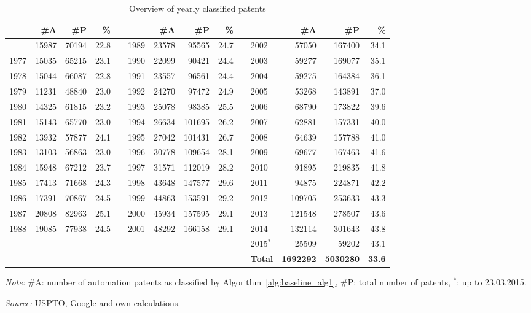 \begin{table}[!htb]
\begin{small}
\begin{threeparttable}
\caption{{\normalsize Overview of yearly classified patents}}
\label{table:table_yearsstats}
\begin{tabular}{lrrrrlrrrrlrrr}
\toprule \addlinespace[0.5em]
 & \textbf{\#A} & \textbf{\#P} & \textbf{\%} & \phantom{aaa} & & \textbf{\#A} & \textbf{\#P} & \textbf{\%} & \phantom{aaa} & & \textbf{\#A} & \textbf{\#P} & \textbf{\%}\tabularnewline[0.1cm]
\midrule \addlinespace[0.5em]
1976 & 15987 & 70194 & 22.8 & & 1989 & 23578 & 95565 & 24.7 & & 2002 & 57050 & 167400 & 34.1 \tabularnewline[0.1cm]
1977 & 15035 & 65215 & 23.1 & & 1990 & 22099 & 90421 & 24.4 & & 2003 & 59277 & 169077 & 35.1 \tabularnewline[0.1cm]
1978 & 15044 & 66087 & 22.8 & & 1991 & 23557 & 96561 & 24.4 & & 2004 & 59275 & 164384 & 36.1 \tabularnewline[0.1cm]
1979 & 11231 & 48840 & 23.0 & & 1992 & 24270 & 97472 & 24.9 & & 2005 & 53268 & 143891 & 37.0 \tabularnewline[0.1cm]
1980 & 14325 & 61815 & 23.2 & & 1993 & 25078 & 98385 & 25.5 & & 2006 & 68790 & 173822 & 39.6 \tabularnewline[0.1cm]
1981 & 15143 & 65770 & 23.0 & & 1994 & 26634 & 101695 & 26.2 & & 2007 & 62881 & 157331 & 40.0 \tabularnewline[0.1cm]
1982 & 13932 & 57877 & 24.1 & & 1995 & 27042 & 101431 & 26.7 & & 2008 & 64639 & 157788 & 41.0 \tabularnewline[0.1cm]
1983 & 13103 & 56863 & 23.0 & & 1996 & 30778 & 109654 & 28.1 & & 2009 & 69677 & 167463 & 41.6 \tabularnewline[0.1cm]
1984 & 15948 & 67212 & 23.7 & & 1997 & 31571 & 112019 & 28.2 & & 2010 & 91895 & 219835 & 41.8 \tabularnewline[0.1cm]
1985 & 17413 & 71668 & 24.3 & & 1998 & 43648 & 147577 & 29.6 & & 2011 & 94875 & 224871 & 42.2 \tabularnewline[0.1cm]
1986 & 17391 & 70867 & 24.5 & & 1999 & 44863 & 153591 & 29.2 & & 2012 & 109705 & 253633 & 43.3 \tabularnewline[0.1cm]
1987 & 20808 & 82963 & 25.1 & & 2000 & 45934 & 157595 & 29.1 & & 2013 & 121548 & 278507 & 43.6 \tabularnewline[0.1cm]
1988 & 19085 & 77938 & 24.5 & & 2001 & 48292 & 166158 & 29.1 & & 2014 & 132114 & 301643 & 43.8 \tabularnewline[0.1cm]
& & & & & & & & & & 2015$^*$ & 25509 & 59202 & 43.1  \tabularnewline[0.1cm]
& & & & & & & & & & \textbf{Total} & \textbf{1692292} & \textbf{5030280} & \textbf{33.6} \tabularnewline[0.1cm]
\bottomrule\end{tabular}
\begin{tablenotes}
\small
\item\textit{Note:} \#A: number of automation patents as classified by Algorithm~\ref{alg:baseline_alg1}, \#P: total number of patents, $^*$: up to 23.03.2015.
\item\textit{Source:} USPTO, Google and own calculations.
\end{tablenotes}
\end{threeparttable}
\end{small}
\end{table}
